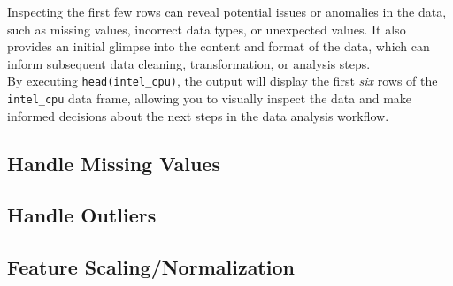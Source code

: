 Inspecting the first few rows can reveal potential issues or anomalies in the data, such as missing values, incorrect data types, or unexpected values. It also provides an initial glimpse into the content and format of the data, which can inform subsequent data cleaning, transformation, or analysis steps.\\

By executing \texttt{head(intel\_cpu)}, the output will display the first \textit{six} rows of the \texttt{intel\_cpu} data frame, allowing you to visually inspect the data and make informed decisions about the next steps in the data analysis workflow.

\subsection{Handle Missing Values}

\subsection{Handle Outliers}

\subsection{Feature Scaling/Normalization}

\newpage